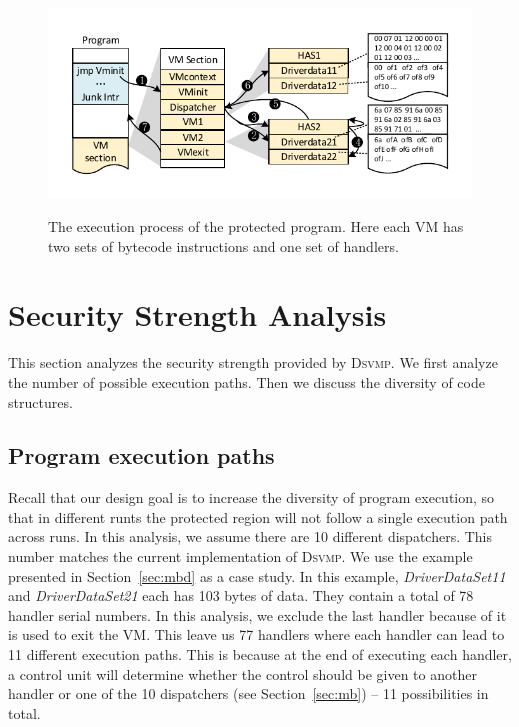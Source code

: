 \documentclass[conference]{IEEEtran}
\newcommand{\DSVMP}{\textsc{Dsvmp}\xspace}
\begin{document}
\begin{figure}[t]
  \centering
  \includegraphics[width=1.0\columnwidth]{figure/figex.pdf}\\
  \caption{The execution process of the protected program. Here each VM has two sets of bytecode instructions and one set of handlers.}\label{fig:Fig.5}
  \vspace{-5mm}
\end{figure}

\section{Security Strength Analysis}
This section analyzes the security strength provided by \DSVMP. We first analyze the number of possible execution paths. Then we discuss the diversity of code structures.

\subsection{Program execution paths}
Recall that our design goal is to increase the diversity of program execution,
so that in different runts the protected region will not follow a single execution path across runs.
In this analysis, we assume there are 10 different dispatchers. This number matches the current implementation of \DSVMP.
We use the example presented in Section~\ref{sec:mbd} as a case study.
In this example,  \emph{DriverDataSet11} and
\emph{DriverDataSet21} each has 103 bytes of data. They contain a total of 78 handler
serial numbers. In this analysis, we exclude the last handler because of it is used to exit the VM.
This leave us 77 handlers where each handler can lead to 11 different execution paths.
This is because at the end of executing each handler, a control unit will determine whether the control
should be given to another handler or one of the 10 dispatchers (see Section~\ref{sec:mb}) -- 11 possibilities in total.
\end{document}
